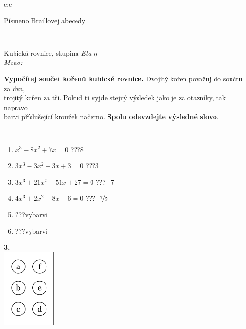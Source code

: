\documentclass[10pt]{report}
\begin{document}
\begin{tabular}{c:c}
\begin{minipage}[c][104.5mm][t]{0.5\linewidth}
\begin{center}
\begin{minipage}{0.20\linewidth}
\begin{center}
{\small Písmeno Braillovej abecedy}
\end{center}
\end{minipage}
\end{center}
\end{minipage}
\\ \hdashline
\begin{minipage}[c][104.5mm][t]{0.5\linewidth}
\begin{center}
\vspace{7mm}
{\huge Kubická rovnice, skupina \textit{Eta $\eta$} -}\\[5mm]
\textit{Meno:}\phantom{xxxxxxxxxxxxxxxxxxxxxxxxxxxxxxxxxxxxxxxxxxxxxxxxxxxxxxxxxxxxxxxxx}\\[5mm]
\begin{minipage}{0.95\linewidth}
\textbf{Vypočítej součet kořenů kubické rovnice.} Dvojitý kořen považuj do součtu za dva,\\trojitý kořen za tři. Pokud ti vyjde stejný výsledek jako je za otazníky, tak napravo\\barvi příslušející kroužek načerno. \textbf{Spolu odevzdejte výsledné slovo}.
\end{minipage}
\\[1mm]
\begin{minipage}{0.79\linewidth}
\begin{center}
\begin{varwidth}{\linewidth}
\begin{enumerate}
\Large
\item $x^3-8x^2+7x=0$\quad \dotfill\; ???\;\dotfill \quad $8$
\item $3x^3-3x^2-3x+3=0$\quad \dotfill\; ???\;\dotfill \quad $3$
\item $3x^3+21x^2-51x+27=0$\quad \dotfill\; ???\;\dotfill \quad $-7$
\item $4x^3+2x^2-8x-6=0$\quad \dotfill\; ???\;\dotfill \quad $\nicefrac{-7}{2}$
\item \quad \dotfill\; ???\;\dotfill \quad vybarvi
\item \quad \dotfill\; ???\;\dotfill \quad vybarvi
\end{enumerate}
\end{varwidth}
\end{center}
\end{minipage}
\begin{minipage}{0.20\linewidth}
\begin{center}
{\Huge\bfseries 3.} \\[2mm]
\includegraphics[height=40mm]{../images/braille.png}

\end{center}
\end{minipage}
\end{center}
\end{minipage}
\end{tabular}
\end{document}
